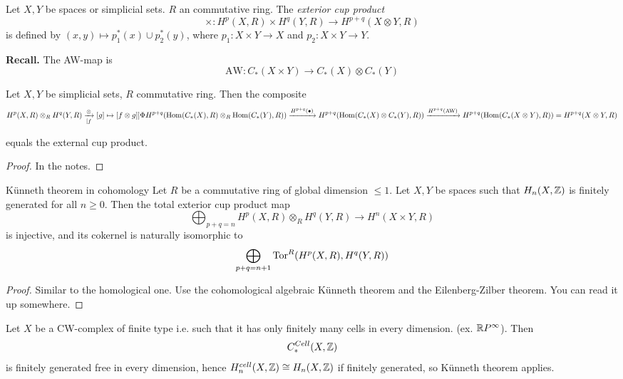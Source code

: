 \documentclass[language=english]{TemplateLecture}
\begin{document}
\begin{construction}
    Let \(X,Y\) be spaces or simplicial sets. \(R\) an commutative ring. The \emph{exterior cup product} 
    \[\times \colon H^p(X,R) \times H^q(Y,R) \to H^{p+q}(X\otimes Y, R)\]
    is defined by \((x,y) \mapsto p_1^*(x) \cup p_2^*(y)\), where \(p_1 \colon X\times Y \to X\) and \(p_2 \colon X \times Y \to Y\).
\end{construction}

\textbf{Recall.} The AW-map is
\[\mathrm{AW}\colon C_*(X\times Y) \to C_*(X) \otimes C_*(Y)\]

\begin{proposition}
    Let \(X, Y\) be simplicial sets, \(R\) commutative ring. Then the composite
    \[H^p(X,R) \otimes_R H^q(Y,R) \xrightarrow[[f]\otimes [g] \mapsto [f\otimes g]]{\Phi} H^{p+q}(\operatorname{Hom}(C_*(X) ,R) \otimes_R \operatorname{Hom}(C_*(Y),R)) \xrightarrow{H^{p+q}(\bullet)} H^{p+q} (\operatorname{Hom}(C_*(X) \otimes C_*(Y), R)) \xrightarrow{H^{p+q}(\mathrm{AW})} H^{p+q}(\operatorname{Hom}(C_*(X \otimes Y), R)) = H^{p+q}(X\otimes Y, R)\]

    equals the external cup product.
\end{proposition}

\begin{proof}
    In the notes.
\end{proof}


\begin{thm}{Künneth theorem in cohomology}{}
    Let \(R\) be a commutative ring of global dimension \(\leq 1\). Let \(X,Y\) be spaces such that \(H_n(X, \mathbb{Z})\) is finitely generated for all \(n \geq 0\). Then the total exterior cup product map
    \[\bigoplus_{p+q = n} H^p(X,R) \otimes_R H^q(Y,R) \to H^n(X \times Y, R)\]
    is injective, and its cokernel is naturally isomorphic to
    \[\bigoplus_{p+q = n+1} \mathrm{Tor}^R(H^p(X,R), H^q(Y,R))\]
\end{thm}

\begin{proof}
    Similar to the homological one. Use the cohomological algebraic Künneth theorem and the Eilenberg-Zilber theorem. You can read it up somewhere.
\end{proof}

\begin{remark}
    Let \(X\) be a CW-complex of finite type  i.e. such that it has only finitely many cells in every dimension. (ex. \(\mathbb{R} P ^\infty\)). Then
    \[C^{Cell}_*(X,\mathbb{Z})\]
    is finitely generated free in every dimension, hence \(H_n^{cell}(X,\mathbb{Z}) \cong H_n(X, \mathbb{Z})\) if finitely generated, so Künneth theorem applies.
\end{remark}
\end{document}
